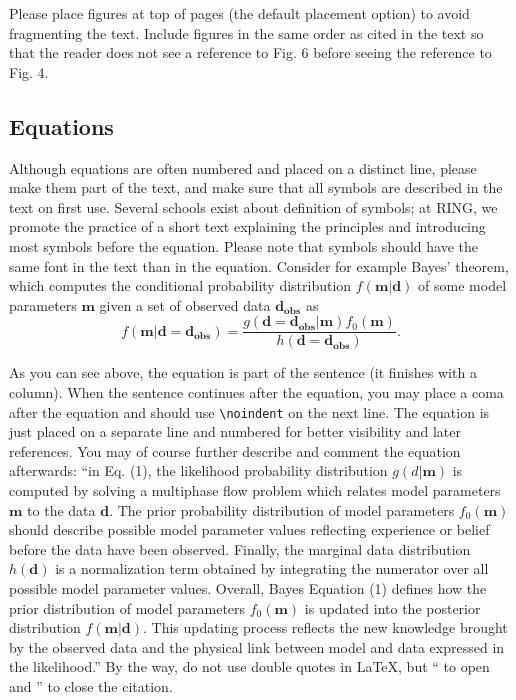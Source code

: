 \documentclass[final]{ring}
\begin{document}
Please place figures at top of pages (the default placement option) to avoid fragmenting the text. Include figures in the same order as cited in the text so that the reader does not see a reference to Fig. 6 before seeing the reference to Fig. 4. 


\subsection{Equations}
Although equations are often numbered and placed on a distinct line, please make them part of the text, and make sure that all symbols are described in the text on first use. Several schools exist about definition of symbols; at RING, we promote the practice of a short text explaining the principles and introducing most symbols before the equation. Please note that symbols should have the same font in the text than in the equation. Consider for example Bayes’ theorem, which computes the conditional probability distribution $f(\mathbf{m}|\mathbf{d})$ of some model parameters $\mathbf{m}$ given a set of observed data $\mathbf{d_{obs}}$ as
\begin{equation}
f(\mathbf{m}| \mathbf{d} = \mathbf{d_{obs}} )=
    \frac{g( \mathbf{d} = \mathbf{d_{obs}} |\mathbf{m}) f_0(\mathbf{m})} 
    {h( \mathbf{d} = \mathbf{d_{obs}} )}.
\label{eq:Bayes}
\end{equation}

\noindent As you can see above, the equation is part of the sentence (it finishes with a column). When the sentence continues after the equation, you may place a coma after the equation and should use \verb|\noindent| on the next line. The equation is just placed on a separate line and numbered for better visibility and later references. You may of course further describe and comment the equation afterwards: ``in Eq. (1), the likelihood probability distribution $g(d|\mathbf{m})$ is computed by solving a multiphase flow problem which relates model parameters $\mathbf{m}$ to the data $\mathbf{d}$. The prior probability distribution of model parameters $f_0 (\mathbf{m})$ should describe possible model parameter values reflecting experience or belief before the data have been observed. Finally, the marginal data distribution $h(\mathbf{d})$ is a normalization term obtained by integrating the numerator over all possible model parameter values. Overall, Bayes Equation (1) defines how the prior distribution of model parameters $f_0 (\mathbf{m})$ is updated into the posterior distribution $f(\mathbf{m}|\mathbf{d})$. This updating process reflects the new knowledge brought by the observed data and the physical link between model and data expressed in the likelihood.'' By the way, do not use double quotes in  \LaTeX, but `` to open and '' to close the citation. 
\end{document}
